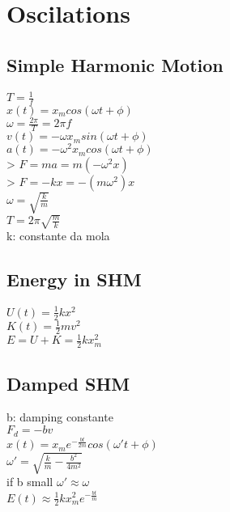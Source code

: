 \section{Oscilations}
\subsection{Simple Harmonic Motion}
$T=\frac{1}{f}$\\
$x\left(t\right)=x_mcos\left(\omega t+\phi \right)$\\
$\omega =\frac{2\pi }{T}=2\pi f$\\
$v\left(t\right)=-\omega x_msin\left(\omega t+\phi \right)$\\
$a\left(t\right)=-\omega ^2x_mcos\left(\omega t+\phi \right)$\\
> $F=ma=m\left(-\omega ^2x\right)$\\
> $F=-kx=-\left(m\omega ^2\right)x$\\
$\omega =\sqrt{\frac{k}{m}}$\\
$T=2\pi \sqrt{\frac{m}{k}}$\\
k: constante da mola\\
\subsection{Energy in SHM}
$U\left(t\right)=\frac{1}{2}kx^2$\\
$K\left(t\right)=\frac{1}{2}mv^2$\\
$E=U+K=\frac{1}{2}kx_m^2$\\
\subsection{Damped SHM}
b: damping constante\\
$F_d=-bv$\\
$x\left(t\right)=x_me^{-\frac{bt}{2m}}cos\left(\omega 't+\phi \right)$\\
$\omega '=\sqrt{\frac{k}{m}-\frac{b^2}{4m^2}}$\\
if b small  $\omega '\approx \omega$\\
$E\left(t\right)\approx \frac{1}{2}kx_m^2e^{-\frac{bt}{m}}$\\
